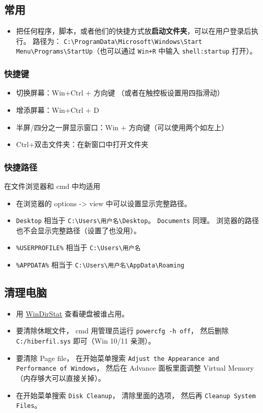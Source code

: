 
\subsection{常用}
\begin{itemize}
\item 把任何程序，脚本，或者他们的快捷方式放\textbf{启动文件夹}，可以在用户登录后执行。 路径为： \verb|C:\ProgramData\Microsoft\Windows\Start Menu\Programs\StartUp|（也可以通过 \verb|Win+R| 中输入 \verb|shell:startup| 打开）。
\end{itemize}

\subsubsection{快捷键}
\begin{itemize}
\item 切换屏幕：Win+Ctrl + 方向键 （或者在触控板设置用四指滑动）
\item 增添屏幕：Win+Ctrl + D
\item 半屏/四分之一屏显示窗口：Win + 方向键（可以使用两个如左上）
\item Ctrl+双击文件夹：在新窗口中打开文件夹
\end{itemize}

\subsubsection{快捷路径}
在文件浏览器和 cmd 中均适用
\begin{itemize}
\item 在浏览器的 options -> view 中可以设置显示完整路径。
\item \verb|Desktop| 相当于 \verb|C:\Users\用户名\Desktop|。 \verb|Documents| 同理。 浏览器的路径也不会显示完整路径（设置了也没用）。
\item \verb|%USERPROFILE%| 相当于 \verb|C:\Users\用户名|
\item \verb|%APPDATA%| 相当于 \verb|C:\Users\用户名\AppData\Roaming|
\end{itemize}


\subsection{清理电脑}
\begin{itemize}
\item 用 \href{https://windirstat.net/}{WinDirStat} 查看硬盘被谁占用。
\item 要清除休眠文件， cmd 用管理员运行 \verb|powercfg -h off|， 然后删除 \verb|C:/hiberfil.sys| 即可（Win 10/11 亲测）。
\item 要清除 Page file， 在开始菜单搜索 \verb|Adjust the Appearance and Performance of Windows|， 然后在 Advance 面板里面调整 Virtual Memory（内存够大可以直接关掉）。
\item 在开始菜单搜索 \verb|Disk Cleanup|， 清除里面的选项， 然后再 \verb|Cleanup System Files|。
\end{itemize}

